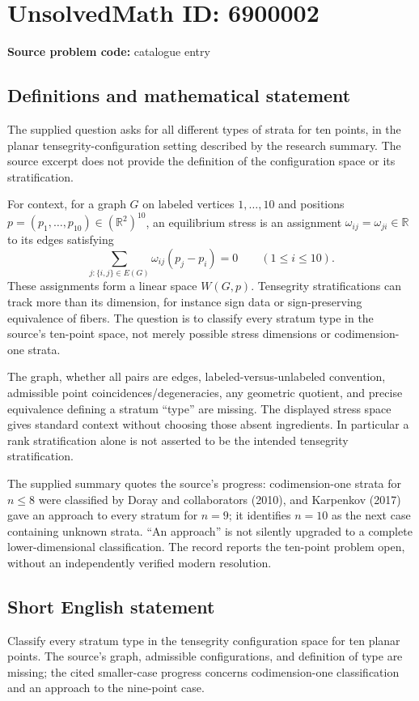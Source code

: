 \documentclass[11pt]{article}
\begin{document}
\section*{UnsolvedMath ID: 6900002}
\textbf{Source problem code:} catalogue entry
\subsection{Definitions and mathematical statement}
The supplied question asks for all different types of strata for ten points, in the planar tensegrity-configuration setting described by the research summary. The source excerpt does not provide the definition of the configuration space or its stratification.

For context, for a graph \(G\) on labeled vertices \(1,\ldots,10\) and positions \(p=(p_1,\ldots,p_{10})\in(\mathbb R^2)^{10}\), an equilibrium stress is an assignment \(\omega_{ij}=\omega_{ji}\in\mathbb R\) to its edges satisfying
\[
 \sum_{j:\{i,j\}\in E(G)}\omega_{ij}(p_j-p_i)=0
 \qquad(1\le i\le10).
\]
These assignments form a linear space \(W(G,p)\). Tensegrity stratifications can track more than its dimension, for instance sign data or sign-preserving equivalence of fibers. The question is to classify every stratum type in the source's ten-point space, not merely possible stress dimensions or codimension-one strata.

The graph, whether all pairs are edges, labeled-versus-unlabeled convention, admissible point coincidences/degeneracies, any geometric quotient, and precise equivalence defining a stratum ``type'' are missing. The displayed stress space gives standard context without choosing those absent ingredients. In particular a rank stratification alone is not asserted to be the intended tensegrity stratification.

The supplied summary quotes the source's progress: codimension-one strata for \(n\le8\) were classified by Doray and collaborators (2010), and Karpenkov (2017) gave an approach to every stratum for \(n=9\); it identifies \(n=10\) as the next case containing unknown strata. ``An approach'' is not silently upgraded to a complete lower-dimensional classification. The record reports the ten-point problem open, without an independently verified modern resolution.
\subsection{Short English statement}
Classify every stratum type in the tensegrity configuration space for ten planar points. The source's graph, admissible configurations, and definition of type are missing; the cited smaller-case progress concerns codimension-one classification and an approach to the nine-point case.
\end{document}

